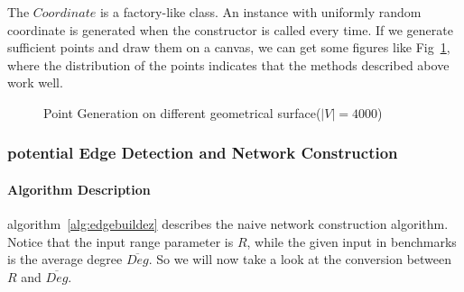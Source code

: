 \documentclass[prodmode,acmtecs]{acmsmall} %
\begin{document}
The $Coordinate$ is a factory-like class. An instance with uniformly random coordinate is generated when the constructor is called every time. If we generate sufficient points and draw them on a canvas, we can get some figures like Fig~\ref{fig:one}, where the distribution of the points indicates that the methods described above work well.
\begin{figure}
\centerline{
}
\caption{Point Generation on different geometrical surface($|V| = 4000$)}
\label{fig:one} %
\end{figure}


\subsubsection{potential Edge Detection and Network Construction}
\paragraph{Algorithm Description} algorithm~\ref{alg:edgebuildez} describes the naive network construction algorithm. Notice that the input range parameter is $R$, while the given input in benchmarks is the average degree $\overline{Deg}$. So we will now take a look at the conversion between $R$ and $\overline{Deg}$.
\end{document}
